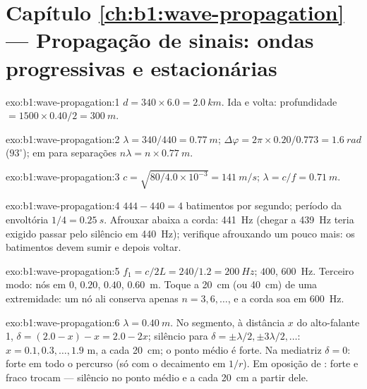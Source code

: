 \section*{Capítulo \ref{ch:b1:wave-propagation} --- Propagação de sinais: ondas progressivas e estacionárias}

\begin{solution}{exo:b1:wave-propagation:1}
$d = 340 \times 6.0 = \qty{2.0}{km}$. Ida e volta: profundidade $= 1500 \times
0.40/2 = \qty{300}{m}$.
\end{solution}

\begin{solution}{exo:b1:wave-propagation:2}
$\lambda = 340/440 = \qty{0.77}{m}$; $\Delta\varphi = 2\pi \times
0.20/0.773 = \qty{1.6}{rad}$ ($93^\circ$); em  para separações
$n\lambda = n \times \qty{0.77}{m}$.
\end{solution}

\begin{solution}{exo:b1:wave-propagation:3}
$c = \sqrt{80/4.0\times10^{-3}} = \qty{141}{m/s}$; $\lambda = c/f =
\qty{0.71}{m}$.
\end{solution}

\begin{solution}{exo:b1:wave-propagation:4}
$444 - 440 = 4$ batimentos por segundo; período da envoltória $1/4 = \qty{0.25}{s}$.
Afrouxar abaixa a corda: \qty{441}{Hz} (chegar a \qty{439}{Hz} teria
exigido passar pelo silêncio em \qty{440}{Hz}); verifique afrouxando
um pouco mais: os batimentos devem sumir e depois voltar.
\end{solution}

\begin{solution}{exo:b1:wave-propagation:5}
$f_1 = c/2L = 240/1.2 = \qty{200}{Hz}$; $400$, \qty{600}{Hz}. Terceiro modo:
nós em $0$, $0.20$, $0.40$, \qty{0.60}{m}. Toque a \qty{20}{cm} (ou
\qty{40}{cm}) de uma extremidade: um nó ali conserva apenas $n = 3, 6, \dots$, e
a corda soa em \qty{600}{Hz}.
\end{solution}

\begin{solution}{exo:b1:wave-propagation:6}
$\lambda = \qty{0.40}{m}$. No segmento, à distância $x$ do alto-falante
1, $\delta = (2.0 - x) - x = 2.0 - 2x$; silêncio para $\delta = \pm\lambda/2,
\pm 3\lambda/2, \dots$: $x = 0.1, 0.3, \dots, 1.9$ m, a cada \qty{20}{cm};
o ponto médio é forte. Na mediatriz $\delta = 0$: forte em todo o percurso (só
com o decaimento em $1/r$). Em oposição de : forte e fraco trocam --- silêncio no
ponto médio e a cada \qty{20}{cm} a partir dele.
\end{solution}

